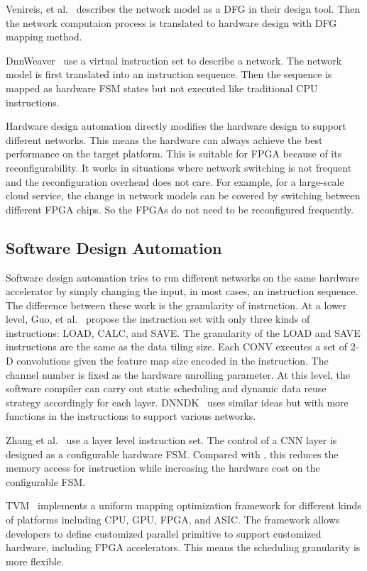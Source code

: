Venireis, et al.~\cite{venieris2017latency} describes the network model as a DFG in their design tool. Then the network computaion process is translated to hardware design with DFG mapping method.

DnnWeaver~\cite{sharma2016high} use a virtual instruction set to describe a network. The network model is first translated into an instruction sequence. Then the sequence is mapped as hardware FSM states but not executed like traditional CPU instructions. 

Hardware design automation directly modifies the hardware design to support different networks. This means the hardware can always achieve the best performance on the target platform. This is suitable for FPGA because of its reconfigurability. It works in situations where network switching is not frequent and the reconfiguration overhead does not care. For example, for a large-scale cloud service, the change in network models can be covered by switching between different FPGA chips. So the FPGAs do not need to be reconfigured frequently.

\subsection{Software Design Automation}

Software design automation tries to run different networks on the same hardware accelerator by simply changing the input, in most cases, an instruction sequence. The difference between these work is the granularity of instruction. At a lower level, Guo, et al.~\cite{guo2017angel} propose the instruction set with only three kinds of instructions: LOAD, CALC, and SAVE. The granularity of the LOAD and SAVE instructions are the same as the data tiling size. Each CONV executes a set of 2-D convolutions given the feature map size encoded in the instruction. The channel number is fixed as the hardware unrolling parameter. At this level, the software compiler can carry out static scheduling and dynamic data reuse strategy accordingly for each layer. DNNDK~\cite{dnndk} uses similar ideas but with more functions in the instructions to support various networks.

Zhang et al.~\cite{zhang2016caffeine} use a layer level instruction set. The control of a CNN layer is designed as a configurable hardware FSM. Compared with \cite{guo2017angel}, this reduces the memory access for instruction while increasing the hardware cost on the configurable FSM.

TVM~\cite{chen2018tvm} implements a uniform mapping optimization framework for different kinds of platforms including CPU, GPU, FPGA, and ASIC. The framework allows developers to define customized parallel primitive to support customized hardware, including FPGA accelerators. This means the scheduling granularity is more flexible.


